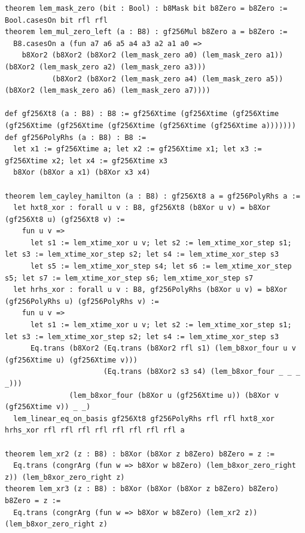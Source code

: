 \documentclass[11pt,letterpaper]{article}
\theoremstyle{spectralthm}
\begin{document}
\begin{lstlisting}[language=Lean4,caption={Standalone Pure Init.Prelude Term-Mode Lean 4 Kernel Suite (thm30--thm61, v0.0.0, 0 sorry, 0 axioms).},label={lst:lean_unified}]
theorem lem_mask_zero (bit : Bool) : b8Mask bit b8Zero = b8Zero := Bool.casesOn bit rfl rfl
theorem lem_mul_zero_left (a : B8) : gf256Mul b8Zero a = b8Zero :=
  B8.casesOn a (fun a7 a6 a5 a4 a3 a2 a1 a0 =>
    b8Xor2 (b8Xor2 (b8Xor2 (lem_mask_zero a0) (lem_mask_zero a1)) (b8Xor2 (lem_mask_zero a2) (lem_mask_zero a3)))
           (b8Xor2 (b8Xor2 (lem_mask_zero a4) (lem_mask_zero a5)) (b8Xor2 (lem_mask_zero a6) (lem_mask_zero a7))))

def gf256Xt8 (a : B8) : B8 := gf256Xtime (gf256Xtime (gf256Xtime (gf256Xtime (gf256Xtime (gf256Xtime (gf256Xtime (gf256Xtime a)))))))
def gf256PolyRhs (a : B8) : B8 :=
  let x1 := gf256Xtime a; let x2 := gf256Xtime x1; let x3 := gf256Xtime x2; let x4 := gf256Xtime x3
  b8Xor (b8Xor a x1) (b8Xor x3 x4)

theorem lem_cayley_hamilton (a : B8) : gf256Xt8 a = gf256PolyRhs a :=
  let hxt8_xor : forall u v : B8, gf256Xt8 (b8Xor u v) = b8Xor (gf256Xt8 u) (gf256Xt8 v) :=
    fun u v =>
      let s1 := lem_xtime_xor u v; let s2 := lem_xtime_xor_step s1; let s3 := lem_xtime_xor_step s2; let s4 := lem_xtime_xor_step s3
      let s5 := lem_xtime_xor_step s4; let s6 := lem_xtime_xor_step s5; let s7 := lem_xtime_xor_step s6; lem_xtime_xor_step s7
  let hrhs_xor : forall u v : B8, gf256PolyRhs (b8Xor u v) = b8Xor (gf256PolyRhs u) (gf256PolyRhs v) :=
    fun u v =>
      let s1 := lem_xtime_xor u v; let s2 := lem_xtime_xor_step s1; let s3 := lem_xtime_xor_step s2; let s4 := lem_xtime_xor_step s3
      Eq.trans (b8Xor2 (Eq.trans (b8Xor2 rfl s1) (lem_b8xor_four u v (gf256Xtime u) (gf256Xtime v)))
                       (Eq.trans (b8Xor2 s3 s4) (lem_b8xor_four _ _ _ _)))
               (lem_b8xor_four (b8Xor u (gf256Xtime u)) (b8Xor v (gf256Xtime v)) _ _)
  lem_linear_eq_on_basis gf256Xt8 gf256PolyRhs rfl rfl hxt8_xor hrhs_xor rfl rfl rfl rfl rfl rfl rfl rfl a

theorem lem_xr2 (z : B8) : b8Xor (b8Xor z b8Zero) b8Zero = z :=
  Eq.trans (congrArg (fun w => b8Xor w b8Zero) (lem_b8xor_zero_right z)) (lem_b8xor_zero_right z)
theorem lem_xr3 (z : B8) : b8Xor (b8Xor (b8Xor z b8Zero) b8Zero) b8Zero = z :=
  Eq.trans (congrArg (fun w => b8Xor w b8Zero) (lem_xr2 z)) (lem_b8xor_zero_right z)


\end{lstlisting}
\end{document}
